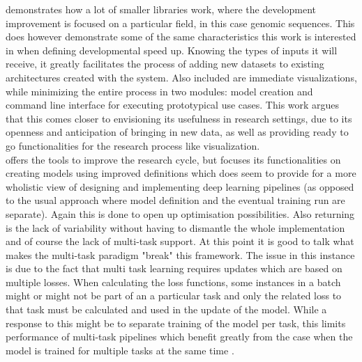\cite{chen2019selene} demonstrates how a lot of smaller libraries work, where the development improvement is focused on a particular field, in this case genomic sequences. This does however demonstrate some of the same characteristics this work is interested in when defining developmental speed up. Knowing the types of inputs it will receive, it greatly facilitates the process of adding new datasets to existing architectures created with the system. Also included are immediate visualizations, while minimizing the entire process in two modules: model creation and command line interface for executing prototypical use cases. This work argues that this comes closer to envisioning its usefulness in research settings, due to its openness and anticipation of bringing in new data, as well as providing ready to go functionalities for the research process like visualization.\\

\cite{tokui2019chainer} offers the tools to improve the research cycle, but focuses its functionalities on creating models using improved definitions which does seem to provide for a more wholistic view of designing and implementing deep learning pipelines (as opposed to the usual approach where model definition and the eventual training run are separate). Again this is done to open up optimisation possibilities. Also returning is the lack of variability without having to dismantle the whole implementation and of course the lack of multi-task support. At this point it is good to talk what makes the multi-task paradigm "break" this framework. The issue in this instance is due to the fact that multi task learning requires updates which are based on multiple losses. When calculating the loss functions, some instances in a batch might or might not be part of an a particular task and only the related loss to that task must be calculated and used in the update of the model. While a response to this might be to separate training of the model per task, this limits performance of multi-task pipelines which benefit greatly from the case when the model is trained for multiple tasks at the same time \cite{georgiev2017low}.\\

